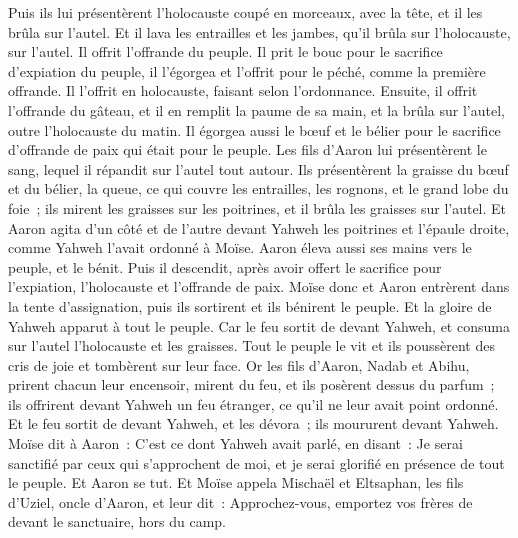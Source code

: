\begin{multicols}{2}
Puis ils lui présentèrent l'holocauste coupé en morceaux, avec la tête, et il les brûla sur l'autel.
Et il lava les entrailles et les jambes, qu'il brûla sur l'holocauste, sur l'autel.
Il offrit l'offrande du peuple. Il prit le bouc pour le sacrifice d'expiation du peuple, il l'égorgea et l'offrit pour le péché, comme la première offrande.
Il l'offrit en holocauste, faisant selon l'ordonnance.
Ensuite, il offrit l'offrande du gâteau, et il en remplit la paume de sa main, et la brûla sur l'autel, outre l'holocauste du matin.
Il égorgea aussi le bœuf et le bélier pour le sacrifice d'offrande de paix qui était pour le peuple. Les fils d'Aaron lui présentèrent le sang, lequel il répandit sur l'autel tout autour.
Ils présentèrent la graisse du bœuf et du bélier, la queue, ce qui couvre les entrailles, les rognons, et le grand lobe du foie~;
ils mirent les graisses sur les poitrines, et il brûla les graisses sur l'autel.
Et Aaron agita d'un côté et de l'autre devant Yahweh les poitrines et l'épaule droite, comme Yahweh l'avait ordonné à Moïse.
Aaron éleva aussi ses mains vers le peuple, et le bénit. Puis il descendit, après avoir offert le sacrifice pour l'expiation, l'holocauste et l'offrande de paix.
Moïse donc et Aaron entrèrent dans la tente d'assignation, puis ils sortirent et ils bénirent le peuple. Et la gloire de Yahweh apparut à tout le peuple.
Car le feu sortit de devant Yahweh, et consuma sur l'autel l'holocauste et les graisses. Tout le peuple le vit et ils poussèrent des cris de joie et tombèrent sur leur face.
\VerseOne{}Or les fils d'Aaron, Nadab et Abihu, prirent chacun leur encensoir, mirent du feu, et ils posèrent dessus du parfum~; ils offrirent devant Yahweh un feu étranger, ce qu'il ne leur avait point ordonné.
Et le feu sortit de devant Yahweh, et les dévora~; ils moururent devant Yahweh.
Moïse dit à Aaron~: C'est ce dont Yahweh avait parlé, en disant~: Je serai sanctifié par ceux qui s'approchent de moi, et je serai glorifié en présence de tout le peuple. Et Aaron se tut.
Et Moïse appela Mischaël et Eltsaphan, les fils d'Uziel, oncle d'Aaron, et leur dit~: Approchez-vous, emportez vos frères de devant le sanctuaire, hors du camp.

\end{multicols}
